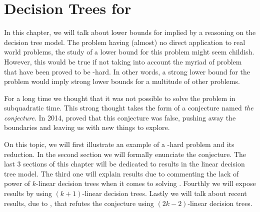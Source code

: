 \chapter{Decision Trees for \threeSUM}

In this chapter, we will talk about lower bounds for \threeSUM implied by
a reasoning on the decision tree model. The \threeSUM problem having (almost) no
direct application to real world problems, the study of a lower bound for this
problem might seem childish. However, this would be true if not taking into
account the myriad of problem that have been proved to be \threeSUM-hard. In
other words, a strong lower bound for the \threeSUM problem would imply strong
lower bounds for a multitude of other problems.

For a long time we thought that it was not possible to solve the \threeSUM
problem in subquadratic time. This strong thought takes the form of a
conjecture named \emph{the \threeSUM conjecture}. In 2014, \citet*{gronlund:2014}
proved that this conjecture was false, pushing away the
boundaries and leaving us with new things to explore.

On this topic, we will first illustrate an example of a \threeSUM-hard problem
and its reduction. In the second section we will formally enunciate the
\threeSUM conjecture. The last 3 sections of this chapter will be dedicated to results
in the linear decision tree model. The third one will explain results due to
\citet*{erickson:1999} commenting the lack of power of $k$-linear
decision trees when it comes to solving \ksum. Fourthly we will expose
results by \citet*{ailon:2005} using $(k+1)$-linear decision trees.
Lastly we will talk about recent results, due to \citet*{gronlund:2014}, that
refutes the \threeSUM conjecture using $(2k-2)$-linear decision trees.
